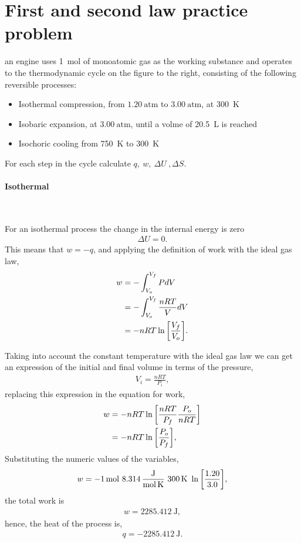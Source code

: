 \documentclass[main.tex]{subfiles}
\begin{document}
\section{First and second law practice problem}
an engine uses \SI{1}{\mole} of monoatomic gas as the working substance and operates to the thermodynamic cycle on the figure to the right, consisting of the following reversible processes:
\begin{itemize}
    \item Isothermal compression, from $1.20~\mathrm{atm}$ to $3.00~\mathrm{atm}$, at \SI{300}{\kelvin}
    \item Isobaric expansion, at $3.00~\mathrm{atm}$, until a volme of \SI{20.5}{\liter} is reached
    \item Isochoric cooling from \SI{750}{\kelvin} to \SI{300}{\kelvin}
\end{itemize}

For each step in the cycle calculate $q,~w,~\Delta U~,\Delta S$.

\paragraph{Isothermal}~

For an isothermal process the change in the internal energy is zero
\begin{gather*}
    \boxed{\Delta U = 0}.
\end{gather*}
This means that $w = -q$, and applying the definition of work with the ideal gas law,
\begin{align*}
    w &= -\int_{V_o}^{V_f} PdV \\
    &= -\int_{V_o}^{V_f} \frac{nRT}{V}dV \\
    &= -nRT\ln\qty[\frac{V_f}{V_o}].
\end{align*}

Taking into account the constant temperature with the ideal gas law we can get an expression of the initial and final volume in terms of the pressure,
\begin{gather*}
    V_i = \frac{nRT}{P_i},
\end{gather*}
replacing this expression in the equation for work,
\begin{align*}
    w &= -nRT\ln\qty[\frac{nRT}{P_f}\frac{P_o}{nRT}] \\
    &= -nRT\ln\qty[\frac{P_o}{P_f}],
\end{align*}
Substituting the numeric values of the variables,
\begin{align*}
    w = -\SI{1}{\mol}~\SI[per-mode=fraction]{8.314}{\joule\per\mole\per\kelvin}~\SI{300}{\kelvin}~\ln\qty[\frac{1.20}{3.0}],
\end{align*}
the total work is
\begin{gather*}
    \boxed{w = \SI{2285.412}{\joule}},
\end{gather*}
hence, the heat of the process is,
\begin{gather*}
    \boxed{q = -\SI{2285.412}{\joule}}.
\end{gather*}
\end{document}
